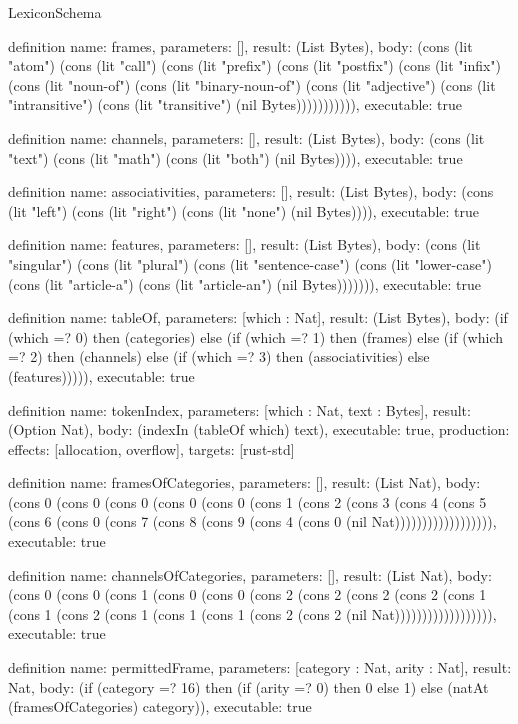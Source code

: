 \begin{lexlean}{LexiconSchema}
\begin{semanticmodule}
definition{
  name: frames,
  parameters: [],
  result: (List Bytes),
  body: (cons (lit "atom") (cons (lit "call") (cons (lit "prefix") (cons (lit "postfix") (cons (lit "infix") (cons (lit "noun-of") (cons (lit "binary-noun-of") (cons (lit "adjective") (cons (lit "intransitive") (cons (lit "transitive") (nil Bytes))))))))))),
  executable: true
}

definition{
  name: channels,
  parameters: [],
  result: (List Bytes),
  body: (cons (lit "text") (cons (lit "math") (cons (lit "both") (nil Bytes)))),
  executable: true
}

definition{
  name: associativities,
  parameters: [],
  result: (List Bytes),
  body: (cons (lit "left") (cons (lit "right") (cons (lit "none") (nil Bytes)))),
  executable: true
}

definition{
  name: features,
  parameters: [],
  result: (List Bytes),
  body: (cons (lit "singular") (cons (lit "plural") (cons (lit "sentence-case") (cons (lit "lower-case") (cons (lit "article-a") (cons (lit "article-an") (nil Bytes))))))),
  executable: true
}

definition{
  name: tableOf,
  parameters: [which : Nat],
  result: (List Bytes),
  body: (if (which =? 0) then (categories) else (if (which =? 1) then (frames) else (if (which =? 2) then (channels) else (if (which =? 3) then (associativities) else (features))))),
  executable: true
}

definition{
  name: tokenIndex,
  parameters: [which : Nat, text : Bytes],
  result: (Option Nat),
  body: (indexIn (tableOf which) text),
  executable: true,
  production: {effects: [allocation, overflow], targets: [rust-std]}
}

definition{
  name: framesOfCategories,
  parameters: [],
  result: (List Nat),
  body: (cons 0 (cons 0 (cons 0 (cons 0 (cons 0 (cons 1 (cons 2 (cons 3 (cons 4 (cons 5 (cons 6 (cons 0 (cons 7 (cons 8 (cons 9 (cons 4 (cons 0 (nil Nat)))))))))))))))))),
  executable: true
}

definition{
  name: channelsOfCategories,
  parameters: [],
  result: (List Nat),
  body: (cons 0 (cons 0 (cons 1 (cons 0 (cons 0 (cons 2 (cons 2 (cons 2 (cons 2 (cons 1 (cons 1 (cons 2 (cons 1 (cons 1 (cons 1 (cons 2 (cons 2 (nil Nat)))))))))))))))))),
  executable: true
}

definition{
  name: permittedFrame,
  parameters: [category : Nat, arity : Nat],
  result: Nat,
  body: (if (category =? 16) then (if (arity =? 0) then 0 else 1) else (natAt (framesOfCategories) category)),
  executable: true
}


\end{semanticmodule}
\end{lexlean}
